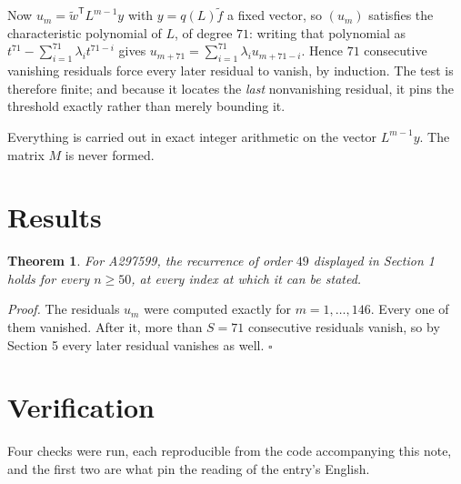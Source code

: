 \documentclass[11pt]{article}
\newtheorem{theorem}{Theorem}
\theoremstyle{definition}
\begin{document}
Now $u_m = \tilde w^{\mathsf T} L^{m-1} y$ with $y = q(L)\tilde f$ a fixed vector, so $(u_m)$ satisfies the characteristic polynomial of $L$, of degree $71$: writing that polynomial as $t^{71} - \sum_{i=1}^{71} \lambda_i t^{71-i}$ gives $u_{m+71} = \sum_{i=1}^{71} \lambda_i u_{m+71-i}$. Hence $71$ consecutive vanishing residuals force every later residual to vanish, by induction. The test is therefore finite; and because it locates the {\itshape last} nonvanishing residual, it pins the threshold exactly rather than merely bounding it.

Everything is carried out in exact integer arithmetic on the vector $L^{m-1}y$. The matrix $M$ is never formed.

\section{Results}

\begin{theorem} For A297599, the recurrence of order $49$ displayed in Section 1 holds for every $n \ge 50$, at every index at which it can be stated.\end{theorem}

{\itshape Proof.} The residuals $u_m$ were computed exactly for $m = 1,\dots,146$. Every one of them vanished. After it, more than $S = 71$ consecutive residuals vanish, so by Section 5 every later residual vanishes as well. $\square$

\section{Verification}

Four checks were run, each reproducible from the code accompanying this note, and the first two are what pin the reading of the entry's English.
\end{document}
